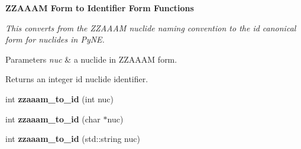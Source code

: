 \begin{Indent}{\bf Z\+Z\+A\+A\+A\+M Form to Identifier Form Functions}\par
{\em This converts from the Z\+Z\+A\+A\+A\+M nuclide naming convention to the id canonical form for nuclides in Py\+N\+E. 
\begin{DoxyParams}{Parameters}
{\em nuc} & a nuclide in Z\+Z\+A\+A\+A\+M form. \\
\hline
\end{DoxyParams}
\begin{DoxyReturn}{Returns}
an integer id nuclide identifier. 
\end{DoxyReturn}
}\begin{DoxyCompactItemize}
\item 
\hypertarget{namespacepyne_1_1nucname_a91692dd60121331c14b1dbf0a37019d5}{int {\bfseries zzaaam\+\_\+to\+\_\+id} (int nuc)}\label{namespacepyne_1_1nucname_a91692dd60121331c14b1dbf0a37019d5}

\item 
\hypertarget{namespacepyne_1_1nucname_af59c86aa17bc9828820f118521b6f7f4}{int {\bfseries zzaaam\+\_\+to\+\_\+id} (char $\ast$nuc)}\label{namespacepyne_1_1nucname_af59c86aa17bc9828820f118521b6f7f4}

\item 
\hypertarget{namespacepyne_1_1nucname_ac99a1d1c1e89b821823e3f2cc8bd8070}{int {\bfseries zzaaam\+\_\+to\+\_\+id} (std\+::string nuc)}\label{namespacepyne_1_1nucname_ac99a1d1c1e89b821823e3f2cc8bd8070}

\end{DoxyCompactItemize}
\end{Indent}
